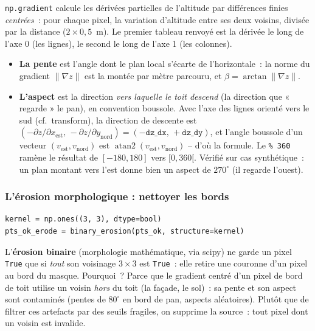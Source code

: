\documentclass[11pt,a4paper]{article}
\newcommand{\fonction}[1]{\texttt{#1}}
\begin{document}
\fonction{np.gradient} calcule les dérivées partielles de l'altitude par
différences finies \emph{centrées}~: pour chaque pixel, la variation d'altitude
entre ses deux voisins, divisée par la distance ($2 \times 0{,}5$~m). Le premier
tableau renvoyé est la dérivée le long de l'axe 0 (les lignes), le second le
long de l'axe 1 (les colonnes).

\begin{itemize}
  \item \textbf{La pente} est l'angle dont le plan local s'écarte de
    l'horizontale~: la norme du gradient $\|\nabla z\|$ est la montée par mètre
    parcouru, et $\beta = \arctan\|\nabla z\|$.
  \item \textbf{L'aspect} est la direction \emph{vers laquelle le toit
    descend} (la direction que « regarde » le pan), en convention boussole.
    Avec l'axe des lignes orienté vers le sud (cf.~transform), la direction de
    descente est $(-\partial z/\partial x_{\text{est}},\,
    -\partial z/\partial y_{\text{nord}}) = (-\fonction{dz\_dx},\,
    +\fonction{dz\_dy})$, et l'angle boussole d'un vecteur $(v_{\text{est}},
    v_{\text{nord}})$ est $\operatorname{atan2}(v_{\text{est}},
    v_{\text{nord}})$ -- d'où la formule. Le \fonction{\% 360} ramène le
    résultat de $[-180, 180]$ vers $[0, 360[$. Vérifié sur cas synthétique~: un
    plan montant vers l'est donne bien un aspect de $270^\circ$ (il regarde
    l'ouest).
\end{itemize}

\subsubsection{L'érosion morphologique : nettoyer les bords}

\begin{lstlisting}
kernel = np.ones((3, 3), dtype=bool)
pts_ok_erode = binary_erosion(pts_ok, structure=kernel)
\end{lstlisting}

L'\textbf{érosion binaire} (morphologie mathématique, via scipy) ne garde un
pixel \fonction{True} que si \emph{tout} son voisinage $3\times3$ est
\fonction{True}~: elle retire une couronne d'un pixel au bord du masque.
Pourquoi~? Parce que le gradient centré d'un pixel de bord de toit utilise un
voisin \emph{hors} du toit (la façade, le sol)~: sa pente et son aspect sont
contaminés (pentes de $80^\circ$ en bord de pan, aspects aléatoires). Plutôt que
de filtrer ces artefacts par des seuils fragiles, on supprime la source~: tout
pixel dont un voisin est invalide.
\end{document}
